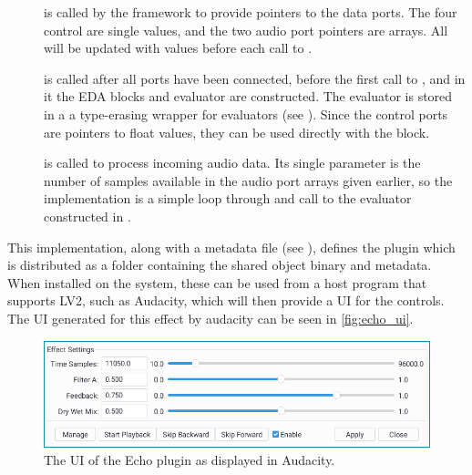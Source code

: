 \begin{description}
  \item [] is called by the framework to provide pointers to the data ports. The four control
        are single values, and the two audio port pointers are arrays. All will be updated with values before each
        call to .
  \item [] is called after all ports have been connected, before the first call to , and in it
        the EDA blocks and evaluator are constructed. The evaluator is stored in a  a
        type-erasing wrapper for evaluators (see ). Since the control ports are pointers to
        float values, they can be used directly with the  block.
  \item [] is called to process incoming audio data. Its single parameter  is the number of
        samples available in the audio port arrays given earlier, so the implementation is a simple loop through and
        call to the evaluator constructed in .
\end{description}

This implementation, along with a metadata file (see ), defines the plugin which is
distributed as a folder containing the shared object binary and metadata. When installed on the system, these
can be used from a host program that supports LV2, such as Audacity, which will then provide a UI for the
controls. The UI generated for this effect by audacity can be seen in \autoref{fig:echo_ui}.

\begin{figure}
  \centering
  \includegraphics[width=\linewidth]{Pictures/echo_ui}
  \caption{The UI of the Echo plugin as displayed in Audacity.}
  \label{fig:echo_ui}
\end{figure}

